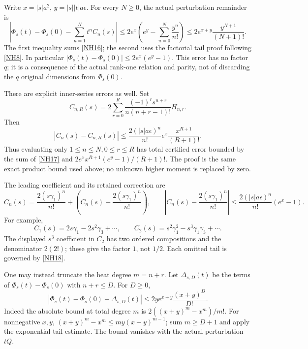 \documentclass[11pt]{article}
\newcommand{\eps}{\epsilon}\newcommand{\spec}{\operatorname{spec}}
\begin{document}
Write \(x=|s|a^2\), \(y=|s||t|a\eps\).
For every \(N\ge0\), the actual perturbation remainder is
\begin{equation}\tag{NH17}\label{NH17}
\left|\Phi_s(t)-\Phi_s(0)-\sum_{n=1}^N t^n C_n(s)\right|
\le 2e^x\left(e^y-\sum_{n=0}^N\frac{y^n}{n!}\right)
\le2e^{x+y}\frac{y^{N+1}}{(N+1)!}.
\end{equation}
The first inequality sums \eqref{NH16}; the second
uses the factorial tail proof following \eqref{NH8}.
In particular
\(|\Phi_s(t)-\Phi_s(0)|\le2e^x(e^y-1)\).
This error has no factor \(q\); it is a consequence of
the actual rank-one relation and parity, not of discarding
the \(q\) original dimensions from \(\Phi_s(0)\).

There are explicit inner-series errors as well. Set
\[
C_{n,R}(s)=2\sum_{r=0}^{R}
\frac{(-1)^rs^{n+r}}{n(n+r-1)!}H_{n,r}.
\]
Then
\begin{equation}\tag{NH18}\label{NH18}
|C_n(s)-C_{n,R}(s)|
\le\frac{2(|s|a\eps)^n}{n!}
e^x\frac{x^{R+1}}{(R+1)!}.
\end{equation}
Thus evaluating only \(1\le n\le N,0\le r\le R\)
has total certified error bounded by the sum of
\eqref{NH17} and
\(2e^x x^{R+1}(e^y-1)/(R+1)!\).
The proof is the same exact product bound used above;
no unknown higher moment is replaced by zero.

The leading coefficient and its retained correction are
\begin{equation}\tag{NH19}\label{NH19}
C_n(s)=\frac{2(s\gamma_1)^n}{n!}
+\left(C_n(s)-\frac{2(s\gamma_1)^n}{n!}\right),\qquad
\left|C_n(s)-\frac{2(s\gamma_1)^n}{n!}\right|
\le\frac{2(|s|a\eps)^n}{n!}(e^x-1).
\end{equation}
For example,
\begin{equation}\tag{NH20}\label{NH20}
C_1(s)=2s\gamma_1-2s^2\gamma_3+\cdots,\qquad
C_2(s)=s^2\gamma_1^2-s^3\gamma_1\gamma_3+\cdots .
\end{equation}
The displayed \(s^3\) coefficient in \(C_2\) has two
ordered compositions and the denominator \(2(2!)\);
these give the factor \(1\), not \(1/2\).
Each omitted tail is governed by \eqref{NH18}.

One may instead truncate the heat degree \(m=n+r\).
Let \(\Delta_{s,D}(t)\) be the terms of
\(\Phi_s(t)-\Phi_s(0)\) with \(n+r\le D\).
For \(D\ge0\),
\begin{equation}\tag{NH21}\label{NH21}
|\Phi_s(t)-\Phi_s(0)-\Delta_{s,D}(t)|
\le 2y e^{x+y}\frac{(x+y)^D}{D!}.
\end{equation}
Indeed the absolute bound at total degree \(m\) is
\(2((x+y)^m-x^m)/m!\).
For nonnegative \(x,y\),
\((x+y)^m-x^m\le my(x+y)^{m-1}\);
sum \(m\ge D+1\) and apply the exponential tail estimate.
The bound vanishes with the actual perturbation \(tQ\).
\end{document}
